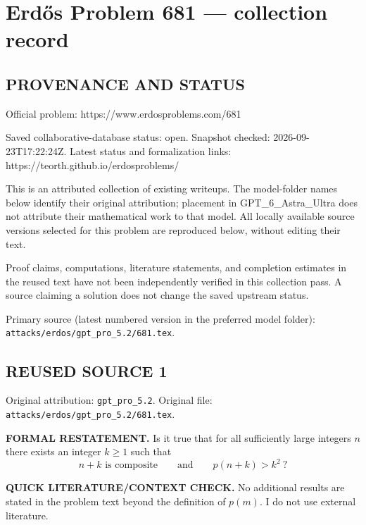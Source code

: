 \section*{Erd\H{o}s Problem 681 --- collection record}

\subsection*{PROVENANCE AND STATUS}
Official problem: https://www.erdosproblems.com/681

Saved collaborative-database status: open.
Snapshot checked: 2026-09-23T17:22:24Z.
Latest status and formalization links: https://teorth.github.io/erdosproblems/

This is an attributed collection of existing writeups. The model-folder names below identify their original attribution; placement in GPT\_6\_Astra\_Ultra does not attribute their mathematical work to that model. All locally available source versions selected for this problem are reproduced below, without editing their text.

Proof claims, computations, literature statements, and completion estimates in the reused text have not been independently verified in this collection pass. A source claiming a solution does not change the saved upstream status.

Primary source (latest numbered version in the preferred model folder): \texttt{attacks/erdos/gpt\_pro\_5.2/681.tex}.

\subsection*{REUSED SOURCE 1}
Original attribution: \texttt{gpt\_pro\_5.2}.
Original file: \texttt{attacks/erdos/gpt\_pro\_5.2/681.tex}.

\item
\textbf{FORMAL RESTATEMENT.}
Is it true that for all sufficiently large integers $n$ there exists an integer $k\ge1$ such that
\[
\text{$n+k$ is composite}\qquad\text{and}\qquad p(n+k)>k^{2}\ ?
\]

\textbf{QUICK LITERATURE/CONTEXT CHECK.}
No additional results are stated in the problem text beyond the definition of $p(m)$. I do not use external literature.

